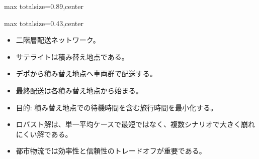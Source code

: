 \begin{minipage}[t]{0.58\textwidth}
\begin{adjustbox}{max totalsize={\textwidth}{0.89\textheight},center}
\begin{minipage}{\textwidth}
\end{minipage}
\end{adjustbox}
\end{minipage}


\clearpage
{}
\begin{minipage}[t]{0.405\textwidth}
\begin{adjustbox}{max totalsize={\textwidth}{0.43\textheight},center}
\begin{minipage}{\textwidth}\scriptsize
{}\begin{itemize}
\item 二階層配送ネットワーク。
\item サテライトは積み替え地点である。
\item デポから積み替え地点へ車両群で配送する。
\item 最終配送は各積み替え地点から始まる。
\item 目的: 積み替え地点での待機時間を含む旅行時間を最小化する。
\end{itemize}\begin{itemize}
\item ロバスト解は、単一平均ケースで最短ではなく、複数シナリオで大きく崩れにくい解である。
\item 都市物流では効率性と信頼性のトレードオフが重要である。
\end{itemize}
\end{minipage}
\end{adjustbox}
\end{minipage}\hfill
